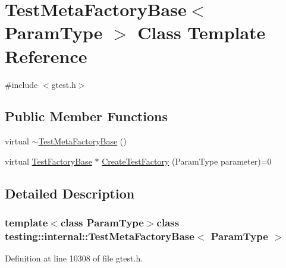 \hypertarget{classtesting_1_1internal_1_1TestMetaFactoryBase}{\section{\-Test\-Meta\-Factory\-Base$<$ \-Param\-Type $>$ \-Class \-Template \-Reference}
\label{da/d3b/classtesting_1_1internal_1_1TestMetaFactoryBase}
}


{\ttfamily \#include $<$gtest.\-h$>$}

\subsection*{\-Public \-Member \-Functions}
\begin{DoxyCompactItemize}
\item 
virtual \hyperlink{classtesting_1_1internal_1_1TestMetaFactoryBase_a98c4c8b2121547b4baa2f0e2116c21ae}{$\sim$\-Test\-Meta\-Factory\-Base} ()
\item 
virtual \hyperlink{classtesting_1_1internal_1_1TestFactoryBase}{\-Test\-Factory\-Base} $\ast$ \hyperlink{classtesting_1_1internal_1_1TestMetaFactoryBase_aa9f88238057597fe5f94c45359f1029d}{\-Create\-Test\-Factory} (\-Param\-Type parameter)=0
\end{DoxyCompactItemize}


\subsection{\-Detailed \-Description}
\subsubsection*{template$<$class \-Param\-Type$>$class testing\-::internal\-::\-Test\-Meta\-Factory\-Base$<$ Param\-Type $>$}



\-Definition at line 10308 of file gtest.\-h.



